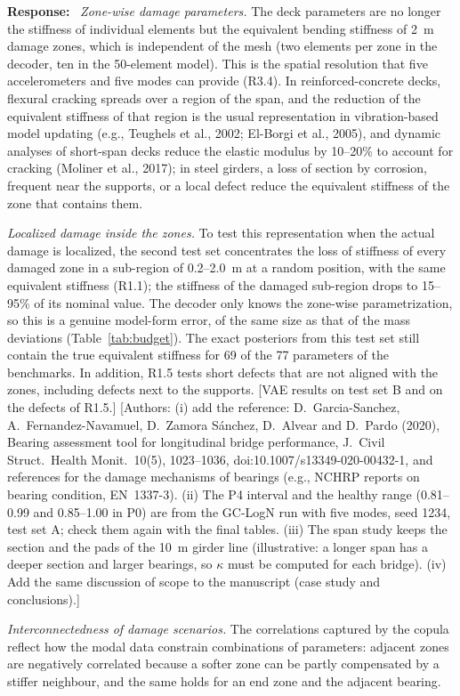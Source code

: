 \documentclass[11pt]{article}
\newenvironment{response}{\par\smallskip\noindent\color{resp}\textbf{Response:}\ }{\par}
\newcommand{\authornote}[1]{\textcolor{note}{\textsf{[Authors: #1]}}}
\newcommand{\tbd}[1]{\textcolor{note}{\textsf{[#1]}}}
\begin{document}
\begin{response}
\textit{Zone-wise damage parameters.} The deck parameters are no longer the stiffness of individual elements but the
equivalent bending stiffness of 2~m damage zones, which is independent of the mesh (two elements per zone in the
decoder, ten in the 50-element model). This is the spatial resolution that five accelerometers and five modes can
provide (R3.4). In reinforced-concrete decks, flexural cracking spreads over a region of the span, and the reduction of
the equivalent stiffness of that region is the usual representation in vibration-based model updating (e.g., Teughels
et al., 2002; El-Borgi et al., 2005), and dynamic analyses of short-span decks reduce the elastic modulus by 10--20\% to
account for cracking (Moliner et al., 2017); in steel girders, a loss of section by corrosion, frequent near the supports, or a local defect reduce
the equivalent stiffness of the zone that contains them.

\textit{Localized damage inside the zones.} To test this representation when the actual damage is localized, the second
test set concentrates the loss of stiffness of every damaged zone in a sub-region of 0.2--2.0~m at a random position,
with the same equivalent stiffness (R1.1); the stiffness of the damaged sub-region drops to 15--95\% of its nominal value.
The decoder only knows the zone-wise parametrization, so this is a genuine model-form error, of the same size as that of
the mass deviations (Table~\ref{tab:budget}). The exact posteriors from this test set still contain the true equivalent
stiffness for 69 of the 77 parameters of the benchmarks. In addition, R1.5 tests short defects that are not aligned with
the zones, including defects next to the supports.
\tbd{VAE results on test set B and on the defects of R1.5.}
\authornote{(i) add the reference: D.~Garcia-Sanchez, A.~Fernandez-Navamuel, D.~Zamora S\'anchez, D.~Alvear and
D.~Pardo (2020), Bearing assessment tool for longitudinal bridge performance, J.\ Civil Struct.\ Health Monit.\ 10(5),
1023--1036, doi:10.1007/s13349-020-00432-1, and references for the damage mechanisms of bearings (e.g., NCHRP reports on
bearing condition, EN~1337-3). (ii) The P4 interval and the healthy range (0.81--0.99 and 0.85--1.00 in P0) are from the
GC-LogN run with five modes, seed 1234, test set A; check them again with the final tables.
(iii) The span study keeps the section and the pads of the 10~m girder line (illustrative: a longer span has a deeper
section and larger bearings, so $\kappa$ must be computed for each bridge). (iv) Add the same discussion of scope to the manuscript (case study and conclusions).}

\textit{Interconnectedness of damage scenarios.} The correlations captured by the copula reflect how the modal data
constrain combinations of parameters: adjacent zones are negatively correlated because a softer zone can be partly
compensated by a stiffer neighbour, and the same holds for an end zone and the adjacent bearing.
\end{response}
\end{document}
